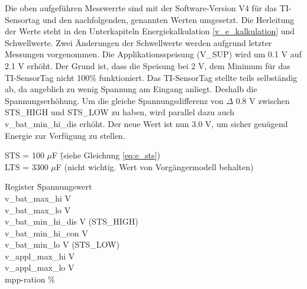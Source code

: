Die oben aufgeführen Messwerrte sind mit der Software-Version V4 für das TI-Sensortag und den nachfolgenden, genannten Werten umgesetzt. Die Herleitung der Werte steht in den Unterkapiteln Energiekalkulation \ref{v_e_kalkulation} und Schwellwerte. Zwei Änderungen der Schwellwerte werden aufgrund letzter Messungen vorgenommen. Die Applikationsspeisung (V\_SUP) wird um 0.1 V auf 2.1 V erhöht. Der Grund ist, dass die Speisung bei 2 V, dem Minimum für das TI-SensorTag nicht 100\thinspace\% funktioniert. Das TI-SensorTag stellte teils selbständig ab, da angeblich zu wenig Spannung am Eingang anliegt. Deshalb die Spannungserhöhung. Um die gleiche Spannungsdifferenz von $\Delta$ 0.8 V zwischen STS\_HIGH und STS\_LOW zu haben, wird parallel dazu auch  v\_bat\_min\_hi\_dis erhöht. Der neue Wert ist nun 3.0 V, um sicher genügend Energie zur Verfügung zu stellen.


\begin{tabbing}
STS = 100 $\mu$F \hspace{1cm} \= (siehe Gleichung \ref{eq:e_sts})\\
LTS = 3300 $\mu$F             \> (nicht wichtig. Wert von Vorgängermodell behalten)
\end{tabbing}

\begin{minipage}{\textwidth}
    \begin{tabbing}
        Register \hspace{2cm} \quad\= Spannungswert \\[0.8ex]
        v\_bat\_max\_hi        V \\
        v\_bat\_max\_lo        V \\
        v\_bat\_min\_hi\_dis   V  (STS\_HIGH)\\
        v\_bat\_min\_hi\_con   V \\
        v\_bat\_min\_lo        V (STS\_LOW)\\
        v\_appl\_max\_hi       V \\
        v\_appl\_max\_lo       V \\   
        mpp-ration            \thinspace\%
    \end{tabbing}
\end{minipage}  



